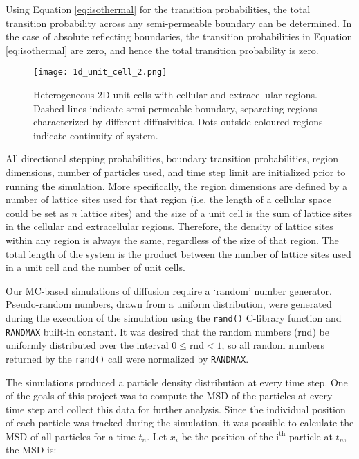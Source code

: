 	Using Equation \ref{eq:isothermal} for the transition probabilities, the total transition probability across any semi-permeable boundary can be determined. In the case of absolute reflecting boundaries, the transition probabilities in Equation \ref{eq:isothermal} are zero, and hence the total transition probability is zero.
	
	\begin{figure}[h]
		\centering
		\texttt{[image: 1d\_unit\_cell\_2.png]}
		\caption{Heterogeneous 2D unit cells with cellular and extracellular regions. Dashed lines indicate semi-permeable boundary, separating regions characterized by different diffusivities. Dots outside coloured regions indicate continuity of system.}
		\label{fig:1d_unit_cell_2.png}
	\end{figure}
	
	\newpage
	All directional stepping probabilities, boundary transition probabilities, region dimensions, number of particles used, and time step limit are initialized prior to running the simulation. More specifically, the region dimensions are defined by a number of lattice sites used for that region (i.e. the length of a cellular space could be set as $ n $ lattice sites) and the size of a unit cell is the sum of lattice sites in the cellular and extracellular regions. Therefore, the density of lattice sites within any region is always the same, regardless of the size of that region. The total length of the system is the product between the number of lattice sites used in a unit cell and the number of unit cells.
	 	
	Our MC-based simulations of diffusion require a `random' number generator. Pseudo-random numbers, drawn from a uniform distribution, were generated during the execution of the simulation using the \texttt{rand()} C-library function and \texttt{RAND\textunderscore MAX} built-in constant. It was desired that the random numbers (rnd) be uniformly distributed over the interval $ 0 \leq \textrm{rnd} < 1 $, so all random numbers returned by the \texttt{rand()} call were normalized by \texttt{RAND\textunderscore MAX}.
	
	The simulations produced a particle density distribution at every time step. One of the goals of this project was to compute the MSD of the particles at every time step and collect this data for further analysis. Since the individual position of each particle was tracked during the simulation, it was possible to calculate the MSD of all particles for a time $ t_n $. Let $ x_i $ be the position of the $ \textrm{i}^\textrm{th} $ particle at $ t_n $, the MSD is:
	
